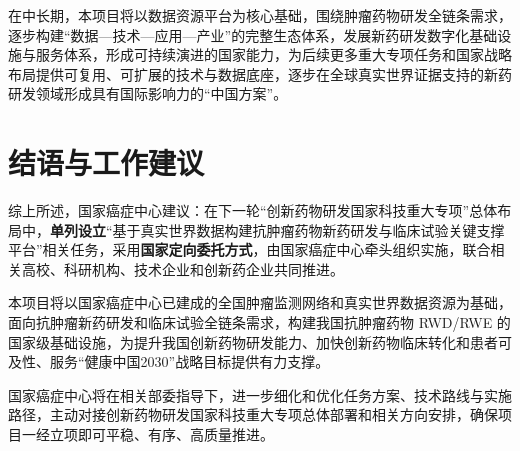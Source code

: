 \documentclass[12pt, a4paper, fontset=mac]{ctexart} %
\begin{document}
在中长期，本项目将以数据资源平台为核心基础，围绕肿瘤药物研发全链条需求，逐步构建“数据—技术—应用—产业”的完整生态体系，发展新药研发数字化基础设施与服务体系，形成可持续演进的国家能力，为后续更多重大专项任务和国家战略布局提供可复用、可扩展的技术与数据底座，逐步在全球真实世界证据支持的新药研发领域形成具有国际影响力的“中国方案”。

\section{结语与工作建议}
综上所述，国家癌症中心建议：在下一轮“创新药物研发国家科技重大专项”总体布局中，\textbf{单列设立}“基于真实世界数据构建抗肿瘤药物新药研发与临床试验关键支撑平台”相关任务，采用\textbf{国家定向委托方式}，由国家癌症中心牵头组织实施，联合相关高校、科研机构、技术企业和创新药企业共同推进。

本项目将以国家癌症中心已建成的全国肿瘤监测网络和真实世界数据资源为基础，面向抗肿瘤新药研发和临床试验全链条需求，构建我国抗肿瘤药物 RWD/RWE 的国家级基础设施，为提升我国创新药物研发能力、加快创新药物临床转化和患者可及性、服务“健康中国2030”战略目标提供有力支撑。

国家癌症中心将在相关部委指导下，进一步细化和优化任务方案、技术路线与实施路径，主动对接创新药物研发国家科技重大专项总体部署和相关方向安排，确保项目一经立项即可平稳、有序、高质量推进。

\vspace{1em}


\end{document}
